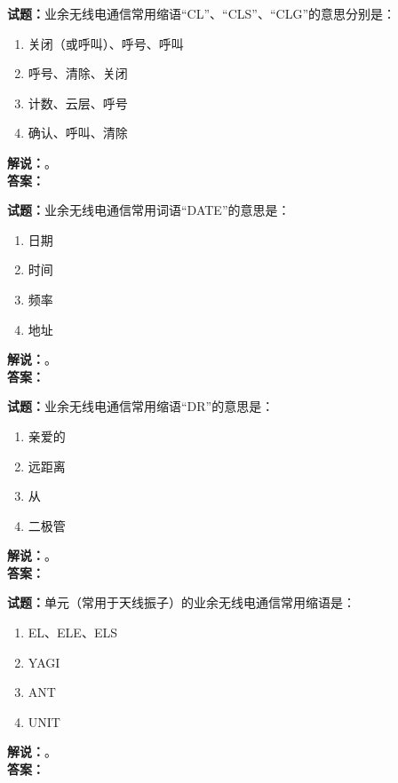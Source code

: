 \documentclass{ctexbook}
\begin{document}
\bigskip




\noindent\textbf{试题：}业余无线电通信常用缩语“CL”、“CLS”、“CLG”的意思分别是：
\begin{enumerate}[leftmargin=3em]
\item 关闭（或呼叫）、呼号、呼叫
\item 呼号、清除、关闭
\item 计数、云层、呼号
\item 确认、呼叫、清除
\end{enumerate}
\noindent\textbf{解说：}\textbf{}。\\\noindent\textbf{答案：}

\bigskip




\noindent\textbf{试题：}业余无线电通信常用词语“DATE”的意思是：
\begin{enumerate}[leftmargin=3em]
\item 日期
\item 时间
\item 频率
\item 地址
\end{enumerate}
\noindent\textbf{解说：}\textbf{}。\\\noindent\textbf{答案：}

\bigskip




\noindent\textbf{试题：}业余无线电通信常用缩语“DR”的意思是：
\begin{enumerate}[leftmargin=3em]
\item 亲爱的
\item 远距离
\item 从
\item 二极管
\end{enumerate}
\noindent\textbf{解说：}\textbf{}。\\\noindent\textbf{答案：}

\bigskip




\noindent\textbf{试题：}单元（常用于天线振子）的业余无线电通信常用缩语是：
\begin{enumerate}[leftmargin=3em]
\item EL、ELE、ELS
\item YAGI
\item ANT
\item UNIT
\end{enumerate}
\noindent\textbf{解说：}\textbf{}。\\\noindent\textbf{答案：}
\end{document}
